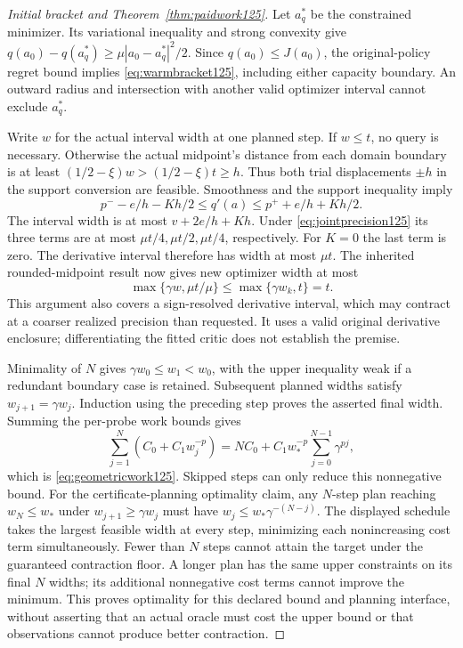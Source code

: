 \begin{proof}[Initial bracket and Theorem~\ref{thm:paidwork125}]
Let $a_q^*$ be the constrained minimizer. Its variational inequality
and strong convexity give
$q(a_0)-q(a_q^*)\ge\mu|a_0-a_q^*|^2/2$.
Since $q(a_0)\le J(a_0)$, the original-policy regret bound implies
\eqref{eq:warmbracket125}, including either capacity boundary.
An outward radius and intersection with another valid optimizer
interval cannot exclude $a_q^*$.

Write $w$ for the actual interval width at one planned step. If
$w\le t$, no query is necessary. Otherwise the actual midpoint's
distance from each domain boundary is at least
$(1/2-\xi)w>(1/2-\xi)t\ge h$. Thus both trial displacements
$\pm h$ in the support conversion are feasible. Smoothness and
the support inequality imply
\[
 p^- - e/h-Kh/2\le q'(a)\le p^+ +e/h+Kh/2.
\]
The interval width is at most $v+2e/h+Kh$. Under
\eqref{eq:jointprecision125} its three terms are at most
$\mu t/4,\mu t/2,\mu t/4$, respectively. For $K=0$ the
last term is zero. The derivative interval therefore has width
at most $\mu t$. The inherited rounded-midpoint result now gives
new optimizer width at most
\[
 \max\{\gamma w,\mu t/\mu\}\le
 \max\{\gamma w_k,t\}=t.
\]
This argument also covers a sign-resolved derivative interval,
which may contract at a coarser realized precision than requested.
It uses a valid original derivative enclosure; differentiating the
fitted critic does not establish the premise.

Minimality of $N$ gives $\gamma w_0\le w_1<w_0$, with the
upper inequality weak if a redundant boundary case is retained.
Subsequent planned widths satisfy $w_{j+1}=\gamma w_j$.
Induction using the preceding step proves the asserted final width.
Summing the per-probe work bounds gives
\[
 \sum_{j=1}^N(C_0+C_1w_j^{-p})
 =NC_0+C_1w_*^{-p}\sum_{j=0}^{N-1}\gamma^{pj},
\]
which is \eqref{eq:geometricwork125}. Skipped steps can only reduce
this nonnegative bound. For the certificate-planning optimality
claim, any $N$-step plan reaching $w_N\le w_*$ under
$w_{j+1}\ge\gamma w_j$ must have
$w_j\le w_*\gamma^{-(N-j)}$. The displayed schedule takes the
largest feasible width at every step, minimizing each nonincreasing
cost term simultaneously. Fewer than $N$ steps cannot attain the
target under the guaranteed contraction floor. A longer plan has
the same upper constraints on its final $N$ widths; its additional
nonnegative cost terms cannot improve the minimum. This proves
optimality for this declared bound and planning interface, without
asserting that an actual oracle must cost the upper bound or that
observations cannot produce better contraction.


\end{proof}
